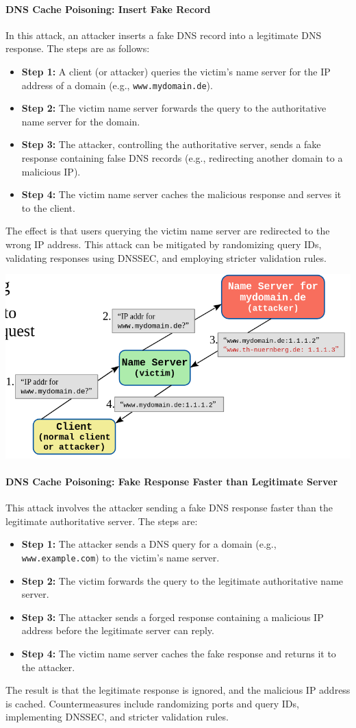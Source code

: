 \paragraph{DNS Cache Poisoning: Insert Fake Record}
In this attack, an attacker inserts a fake DNS record into a legitimate DNS response. The steps are as follows:
\begin{itemize}
    \item \textbf{Step 1:} A client (or attacker) queries the victim's name server for the IP address of a domain (e.g., \texttt{www.mydomain.de}).
    \item \textbf{Step 2:} The victim name server forwards the query to the authoritative name server for the domain.
    \item \textbf{Step 3:} The attacker, controlling the authoritative server, sends a fake response containing false DNS records (e.g., redirecting another domain to a malicious IP).
    \item \textbf{Step 4:} The victim name server caches the malicious response and serves it to the client.
\end{itemize}
The effect is that users querying the victim name server are redirected to the wrong IP address. This attack can be mitigated by randomizing query IDs, validating responses using DNSSEC, and employing stricter validation rules.

\includegraphics[width=0.7\columnwidth]{Resources/dns_poison1.png}

\paragraph{DNS Cache Poisoning: Fake Response Faster than Legitimate Server}
This attack involves the attacker sending a fake DNS response faster than the legitimate authoritative server. The steps are:
\begin{itemize}
    \item \textbf{Step 1:} The attacker sends a DNS query for a domain (e.g., \texttt{www.example.com}) to the victim's name server.
    \item \textbf{Step 2:} The victim forwards the query to the legitimate authoritative name server.
    \item \textbf{Step 3:} The attacker sends a forged response containing a malicious IP address before the legitimate server can reply.
    \item \textbf{Step 4:} The victim name server caches the fake response and returns it to the attacker.
\end{itemize}
The result is that the legitimate response is ignored, and the malicious IP address is cached. Countermeasures include randomizing ports and query IDs, implementing DNSSEC, and stricter validation rules.

